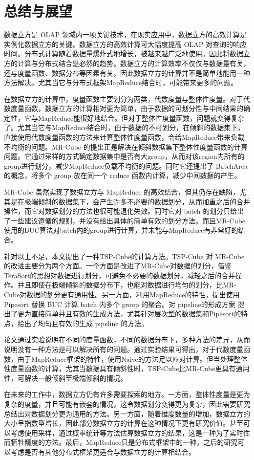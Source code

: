 
\chapter{总结与展望}

数据立方是 OLAP 领域内一项关键技术，在现实应用中，数据立方的高效计算是实例化数据立方的关键。数据立方的高效计算可大幅度提高 OLAP 对查询的响应时间。分布式计算随着数据量爆炸式地增长，被越来越广泛地使用。因此将数据立方的计算与分布式结合是必然的趋势。数据立方的计算效率不仅仅与数据量有关，还与度量函数、数据分布等因素有关，因此数据立方的计算并不是简单地能用一种方法解决。尤其当它与分布式框架MapReduce结合时，可能带来更多的问题。

在数据立方的计算中，度量函数主要划分为两类，代数度量与整体性度量。对于代数度量函数，数据立方的计算相对更为简单，由于数据的可划分性与中间结果的确定性，它与MapReduce能很好地结合。但对于整体性度量函数，问题就变得复杂了。尤其当它与MapReduce结合时，由于数据的不可划分，在倾斜的数据集下，直接使用代数度量函数的方法来计算整体性度量函数，会给MapReduce带来负载不均衡的问题。MR-Cube 的提出正是解决在倾斜数据集下整体性度量函数的计算问题。它通过采样的方式确定数据集中是否有大group，从而对该region内所有的group进行划分，减少MapReduce负载不均衡的问题。同时它还提出了 BatchArea 的概念，将多个 group 放在同一个 reduce 函数内计算，减少中间数据的产生。

MR-Cube 虽然实现了数据立方与 MapReduce 的高效结合，但其仍存在缺陷，尤其是在极端倾斜的数据集下，会产生许多不必要的数据划分，从而加重之后的合并操作，而它对数据划分的方法也很可能退化失效。同时它对 batch 的划分只给出了一些建议遵循的规则，并没有给出具体的简单有效的划分方法。而且MR-Cube使用的BUC算法对batch内的group进行计算，并未能与MapReduce有非常好的结合。

针对以上不足，本文提出了一种TSP-Cube的计算方法。TSP-Cube 对 MR-Cube的改进主要分为两个方面。一个方面是改进了MR-Cube对数据的划分，借鉴TeraSort的思想对数据进行划分，可避免不必要的数据划分，减轻之后的合并操作。并且即使在极端倾斜的数据分布下，也能对数据进行均匀的划分，比MR-Cube对数据的划分更有通用性。另一方面，利用MapReduce的特性，提出使用 Pipesort 替换 BUC 计算 batch 内多个 group 的聚合。对 pipeline的形成方案 提出了更为直接简单并且有效的生成方法，尤其针对层次型的数据集和Pipesort的特点，给出了均匀且有效的生成 pipeline 的方法。

论文通过实验说明在不同的度量函数，不同的数据分布下，多种方法的差异，从而说明没有一种方法是可以解决所有的问题。通过实验结果可得出，对于代数度量函数，由于MapReduce框架的特性，使用Naive的方法足以应对计算。但当处理整体性度量函数的计算，尤其当数据具有倾斜性时，TSP-Cube比MR-Cube更具有通用性，可解决一般倾斜至极端倾斜的情况。

在未来的工作中，数据立方仍有许多需要探索的地方。一方面，整体性度量是更为复杂的度量，并且可能有嵌套的情况，这令数据划分变得更为复杂，因此需要研究总结出对数据划分更为通用的方法。另一方面，随着维度数量的增加，数据立方的大小呈指数型增长，因此部分数据立方的计算在这种情况下更有研究价值。甚至可以考虑使用采样，通过概率统计等方法估算数据立方的结果，这是一种为了实时性而牺牲精度的方法。最后，MapReduce只是分布式框架中的一种，之后的研究可以考虑是否有其他分布式框架更适合与数据立方的计算相结合。

